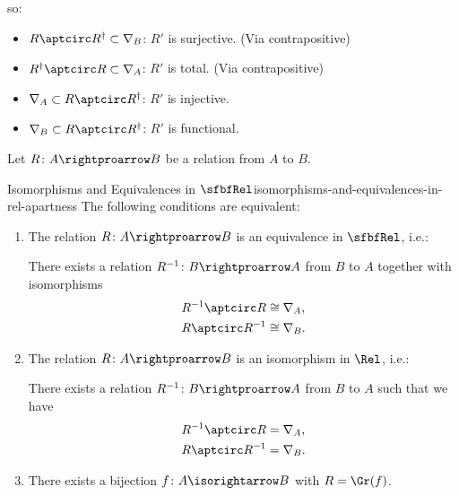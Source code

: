 so:
\begin{itemize}
    \item $R\aptcirc R^{\dagger}\subset\nabla_{B}$:  $R'$ is surjective. (Via contrapositive)
    \item $R^{\dagger}\aptcirc R\subset\nabla_{A}$:  $R'$ is total. (Via contrapositive)
    \item $\nabla_{A}\subset R\aptcirc R^{\dagger}$: $R'$ is injective.
    \item $\nabla_{B}\subset R\aptcirc R^{\dagger}$: $R'$ is functional.
\end{itemize}
Let $R\colon A\rightproarrow B$ be a relation from $A$ to $B$.
\begin{proposition}{Isomorphisms and Equivalences in $\sfbfRel$}{isomorphisms-and-equivalences-in-rel-apartness}%
    The following conditions are equivalent:
    \begin{enumerate}
        \item\label{isomorphisms-and-equivalences-in-rel-apartness-1}The relation $R\colon A\rightproarrow B$ is an equivalence in $\sfbfRel$, i.e.:
            \begin{itemize}
                \itemstar There exists a relation $R^{-1}\colon B\rightproarrow A$ from $B$ to $A$ together with isomorphisms
                    \begin{align*}
                        R^{-1}\aptcirc R &\cong \nabla_{A},\\
                        R\aptcirc R^{-1} &\cong \nabla_{B}.
                    \end{align*}
            \end{itemize}
        \item\label{isomorphisms-and-equivalences-in-rel-apartness-2}The relation $R\colon A\rightproarrow B$ is an isomorphism in $\Rel$, i.e.:
            \begin{itemize}
                \itemstar There exists a relation $R^{-1}\colon B\rightproarrow A$ from $B$ to $A$ such that we have
                    \begin{align*}
                        R^{-1}\aptcirc R &= \nabla_{A},\\
                        R\aptcirc R^{-1} &= \nabla_{B}.
                    \end{align*}
            \end{itemize}
        \item\label{isomorphisms-and-equivalences-in-rel-apartness-3}There exists a bijection $f\colon A\isorightarrow B$ with $R=\Gr(f)$.
    \end{enumerate}
\end{proposition}
